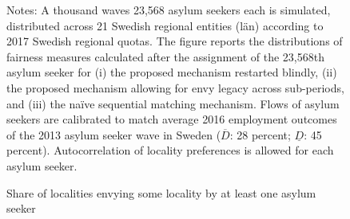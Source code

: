 \documentclass[12pt,fleqn]{article}
\begin{document}
\begin{figure}
	\caption{Share of localities envying some locality by at least one asylum seeker \label{FIG:quotas_fair0}}
	\begin{center}
	\end{center}
		{\scriptsize \vspace{-1em}
	\begin{singlespace}
		{\sc Notes:} A thousand waves 23,568 asylum seekers each is simulated, distributed across 21 Swedish regional entities (l\"{a}n) according to 2017 Swedish regional quotas. The figure reports the distributions of fairness measures calculated after the assignment of the 23,568th asylum seeker for (i) the proposed mechanism restarted blindly, (ii) the proposed mechanism allowing for envy legacy across sub-periods, and (iii) the na\"{i}ve sequential matching mechanism. Flows of asylum seekers are calibrated to match average 2016 employment outcomes of the 2013 asylum seeker wave in Sweden ($\overline{D}$: 28 percent; $\underline{D}$: 45 percent). Autocorrelation of locality preferences is allowed for each asylum seeker.
	\end{singlespace}
	 }
\end{figure}
\end{document}
